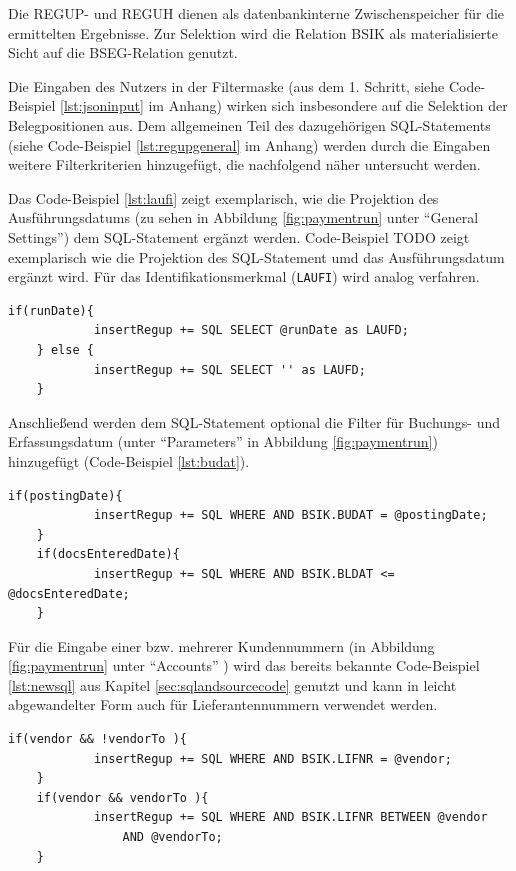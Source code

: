 Die REGUP- und REGUH dienen als datenbankinterne Zwischenspeicher für die ermittelten Ergebnisse.
Zur Selektion wird die Relation BSIK als materialisierte Sicht auf die BSEG-Relation genutzt.

Die Eingaben des Nutzers in der Filtermaske (aus dem 1. Schritt, siehe Code-Beispiel \ref{lst:jsoninput} im Anhang) wirken sich insbesondere auf die Selektion der Belegpositionen aus.
Dem allgemeinen Teil des dazugehörigen SQL-Statements (siehe Code-Beispiel \ref{lst:regupgeneral} im Anhang) werden durch die Eingaben weitere Filterkriterien hinzugefügt, die nachfolgend näher untersucht werden.

Das Code-Beispiel \ref{lst:laufi} zeigt exemplarisch, wie die Projektion des Ausführungsdatums (zu sehen in Abbildung \ref{fig:paymentrun} unter ``General Settings'') dem SQL-Statement ergänzt werden.
Code-Beispiel TODO zeigt exemplarisch wie die Projektion des SQL-Statement umd das Ausführungsdatum ergänzt wird.
Für das Identifikationsmerkmal (\texttt{LAUFI}) wird analog verfahren.

\begin{lstlisting}[caption={Ergänzung der Projektion um das Ausführungsdatum}, label={lst:laufi}, language=JavaScriptSQL]
	if(runDate){
			insertRegup += SQL SELECT @runDate as LAUFD;
	} else {
			insertRegup += SQL SELECT '' as LAUFD;
	}
\end{lstlisting}

Anschließend werden dem SQL-Statement optional die Filter für Buchungs- und Erfassungsdatum (unter ``Parameters'' in Abbildung \ref{fig:paymentrun}) hinzugefügt (Code-Beispiel \ref{lst:budat}).

\begin{lstlisting}[caption={Einfügen zusätzlicher Filter}, label={lst:budat}, language=JavaScriptSQL]
	if(postingDate){
			insertRegup += SQL WHERE AND BSIK.BUDAT = @postingDate;
	}
	if(docsEnteredDate){
			insertRegup += SQL WHERE AND BSIK.BLDAT <= @docsEnteredDate;
	}
\end{lstlisting}

Für die Eingabe einer bzw. mehrerer Kundennummern (in Abbildung \ref{fig:paymentrun} unter ``Accounts'' ) wird das bereits bekannte Code-Beispiel \ref{lst:newsql} aus Kapitel \ref{sec:sqlandsourcecode} genutzt und kann in leicht abgewandelter Form auch für Lieferantennummern verwendet werden.

\begin{lstlisting}[caption={Unterscheidung zwischen Einzel- und Bereichsfilter}, label={lst:vendor}, language=JavaScriptSQL]
	if(vendor && !vendorTo ){
			insertRegup += SQL WHERE AND BSIK.LIFNR = @vendor;
	}
	if(vendor && vendorTo ){
			insertRegup += SQL WHERE AND BSIK.LIFNR BETWEEN @vendor
				AND @vendorTo;
	}
\end{lstlisting}

